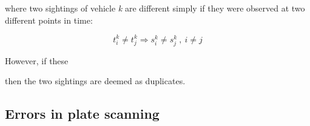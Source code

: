 where two sightings of vehicle \emph{k} are different simply if they were observed at two different points in time:

\begin{equation} \label{e.sighting.different}
t^{k}_{i} \ne t^{k}_{j} \Rightarrow s^{k}_{i} \ne s^{k}_{j} \ , \ i \ne j
\end{equation}

However, if these

then the two sightings are deemed as duplicates.

\subsection{Errors in plate scanning}
